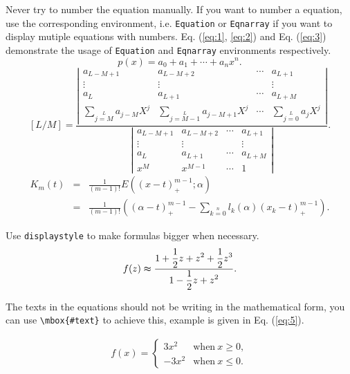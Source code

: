 \documentclass[print]{jicspack}
\begin{document}
Never try to number the equation manually. If you want to number a
equation, use the corresponding environment, i.e. \verb|Equation|
or \verb|Eqnarray| if you want to display mutiple equations with
numbers. Eq. (\ref{eq:1}, \ref{eq:2})  and Eq. (\ref{eq:3})
demonstrate the usage of \verb|Equation| and \verb|Eqnarray|
environments respectively.
\begin{equation}\label{eq:1}
p(x)=a_0+a_1+\cdots+a_nx^n.
\end{equation}
\begin{equation}\label{eq:2}
[L/M]=\frac
{\left|
\begin{array}{cccc}
a_{L-M+1} & a_{L-M+2} & \cdots & a_{L+1}\\
\vdots & \vdots &  & \vdots\\
a_{L} & a_{L+1} & \cdots & a_{L+M}\\
\sum\limits_{j=M}\limits^{L}a_{j-M}{X^j} & \sum\limits_{j=M-1}\limits^{L}a_{j-M+1}{X^j} & \cdots & \sum\limits_{j=0}\limits^{L}a_{j}{X^j}\end{array}
\right|}
{\left|
\begin{array}{cccc}
a_{L-M+1} & a_{L-M+2} & \cdots & a_{L+1}\\
\vdots & \vdots &  & \vdots\\
a_{L} & a_{L+1} & \cdots & a_{L+M}\\
x^{M} & x^{M-1} & \cdots & 1
\end{array}
\right|}.
\end{equation}
\begin{eqnarray}\label{eq:3}
K_m(t)&=&\frac{1}{(m-1)!}E((x-t)_{+}^{m-1};\alpha)\nonumber\\
      &=&\frac{1}{(m-1)!}\left((\alpha-t)_{+}^{m-1}-\sum\limits_{k=0}\limits^{n}l_k(\alpha)(x_k-t)_{+}^{m-1}\right).
\end{eqnarray}

Use \verb|displaystyle|  to make formulas bigger when necessary.
\begin{equation}\label{eq:4}
f(z)\thickapprox\frac{\displaystyle 1+\frac{1}{2}z+z^2+\frac{1}{2}z^3}{\displaystyle 1-\frac{1}{2}z+z^2}.
\end{equation}

The texts in the equations should not be writing in the
mathematical form, you can use \verb|\mbox{#text}| to achieve
this, example is given in Eq. (\ref{eq:5}).


\begin{eqnarray}\label{eq:5}
f(x)=\left\{\begin{array}{ll}3x^2 & \mbox{when}\ x\geqslant 0,\\-3x^2 & \mbox{when}\ x\leqslant 0.\end{array}\right.
\end{eqnarray}
\end{document}
